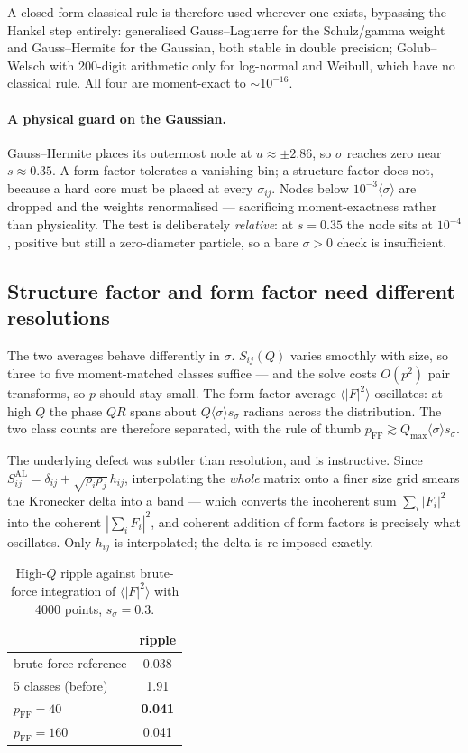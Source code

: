 \documentclass[11pt,a4paper]{article}
\begin{document}
A closed-form classical rule is therefore used wherever one exists, bypassing
the Hankel step entirely: generalised Gauss--Laguerre for the Schulz/gamma
weight and Gauss--Hermite for the Gaussian, both stable in double precision;
Golub--Welsch with 200-digit arithmetic only for log-normal and Weibull, which
have no classical rule. All four are moment-exact to $\sim10^{-16}$.

\paragraph{A physical guard on the Gaussian.} Gauss--Hermite places its
outermost node at $u\approx\pm2.86$, so $\sigma$ reaches zero near
$s\approx0.35$. A form factor tolerates a vanishing bin; a structure factor
does not, because a hard core must be placed at every $\sigma_{ij}$. Nodes
below $10^{-3}\langle\sigma\rangle$ are dropped and the weights renormalised
--- sacrificing moment-exactness rather than physicality. The test is
deliberately \emph{relative}: at $s=0.35$ the node sits at $10^{-4}$, positive
but still a zero-diameter particle, so a bare $\sigma>0$ check is insufficient.

\subsection{Structure factor and form factor need different resolutions}
\label{sec:nff}

The two averages behave differently in $\sigma$. $S_{ij}(Q)$ varies smoothly
with size, so three to five moment-matched classes suffice --- and the solve
costs $O(p^2)$ pair transforms, so $p$ should stay small. The form-factor
average $\langle|F|^2\rangle$ oscillates: at high $Q$ the phase $QR$ spans
about $Q\langle\sigma\rangle s_\sigma$ radians across the distribution. The
two class counts are therefore separated, with the rule of thumb
$p_{\mathrm{FF}}\gtrsim Q_{\max}\langle\sigma\rangle s_\sigma$.

The underlying defect was subtler than resolution, and is instructive. Since
$S^{\mathrm{AL}}_{ij}=\delta_{ij}+\sqrt{\rho_i\rho_j}\,h_{ij}$, interpolating
the \emph{whole} matrix onto a finer size grid smears the Kronecker delta into
a band --- which converts the incoherent sum $\sum_i|F_i|^2$ into the coherent
$|\sum_i F_i|^2$, and coherent addition of form factors is precisely what
oscillates. Only $h_{ij}$ is interpolated; the delta is re-imposed exactly.

\begin{table}[htbp]
\centering
\caption{High-$Q$ ripple against brute-force integration of
$\langle|F|^2\rangle$ with 4000 points, $s_\sigma=0.3$.}
\begin{tabular}{lc}
\toprule
 & ripple\\
\midrule
brute-force reference        & 0.038\\
5 classes (before)           & 1.91\\
$p_{\mathrm{FF}}=40$         & \textbf{0.041}\\
$p_{\mathrm{FF}}=160$        & 0.041\\
\bottomrule
\end{tabular}
\end{table}
\end{document}
